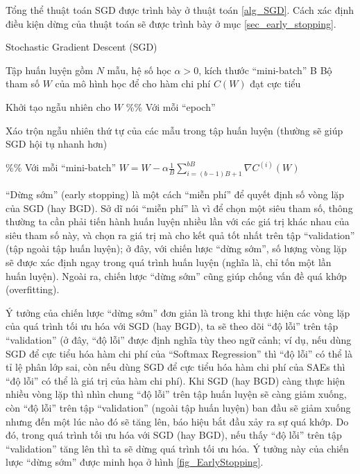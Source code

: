 Tổng thể thuật toán SGD được trình bày ở thuật toán \ref{alg_SGD}. Cách xác định điều kiện dừng của thuật toán sẽ được trình bày ở mục \ref{sec_early_stopping}.
\begin{algorithm}
	\caption{Stochastic Gradient Descent (SGD)}
	\label{alg_SGD}
	\begin{algorithmic}[1]
		\renewcommand{\algorithmicrequire}{\textbf{Đầu vào:}}
		\renewcommand{\algorithmicensure}{\textbf{Đầu ra:}}
		\algnewcommand{}
		\algnewcommand\Operation{\item[\algorithmicoperation]}
		
		\Require Tập huấn luyện gồm $N$ mẫu, hệ số học $\alpha>0$, kích thước ``mini-batch'' B
		\Ensure Bộ tham số $W$ của mô hình học để cho hàm chi phí $C(W)$ đạt cực tiểu
		
		\Operation
		\State Khởi tạo ngẫu nhiên cho $W$
		 \%\% Với mỗi ``epoch''
			\State \parbox[t]{\dimexpr\linewidth-\algorithmicindent}{Xáo trộn ngẫu nhiên thứ tự của các mẫu trong tập huấn luyện (thường sẽ giúp SGD hội tụ nhanh hơn)\strut}
			 \%\% Với mỗi ``mini-batch''
				\State $W = W - \alpha \frac{1}{B} \sum_{i=(b-1)B+1}^{bB} \nabla C^{(i)}(W)$ 
			\EndFor
		\EndWhile
	\end{algorithmic}
\end{algorithm}


``Dừng sớm'' (early stopping) là một cách ``miễn phí'' để quyết định số vòng lặp của SGD (hay BGD). Sở dĩ nói ``miễn phí'' là vì để chọn một siêu tham số, thông thường ta cần phải tiến hành huấn luyện nhiều lần với các giá trị khác nhau của siêu tham số này, và chọn ra giá trị mà cho kết quả tốt nhất trên tập ``validation'' (tập ngoài tập huấn luyện); ở đây, với chiến lược ``dừng sớm'', số lượng vòng lặp sẽ được xác định ngay trong quá trình huấn luyện (nghĩa là, chỉ tốn một lần huấn luyện). Ngoài ra, chiến lược ``dừng sớm'' cũng giúp chống vấn đề quá khớp (overfitting).

Ý tưởng của chiến lược ``dừng sớm'' đơn giản là trong khi thực hiện các vòng lặp của quá trình tối ưu hóa với SGD (hay BGD), ta sẽ theo dõi ``độ lỗi'' trên tập ``validation'' (ở đây, ``độ lỗi'' được định nghĩa tùy theo ngữ cảnh; ví dụ, nếu dùng SGD để cực tiểu hóa hàm chi phí của ``Softmax Regression'' thì ``độ lỗi'' có thể là tỉ lệ phân lớp sai, còn nếu dùng SGD để cực tiểu hóa hàm chi phí của SAEs thì ``độ lỗi'' có thể là giá trị của hàm chi phí). Khi SGD (hay BGD) càng thực hiện nhiều vòng lặp thì nhìn chung ``độ lỗi'' trên tập huấn luyện sẽ càng giảm xuống, còn ``độ lỗi'' trên tập ``validation'' (ngoài tập huấn luyện) ban đầu sẽ giảm xuống nhưng đến một lúc nào đó sẽ tăng lên, báo hiệu bắt đầu xảy ra sự quá khớp. Do đó, trong quá trình tối ưu hóa với SGD (hay BGD), nếu thấy ``độ lỗi'' trên tập ``validation'' tăng lên thì ta sẽ dừng quá trình tối ưu hóa. Ý tưởng này của chiến lược ``dừng sớm'' được minh họa ở hình \ref{fig_EarlyStopping}.

